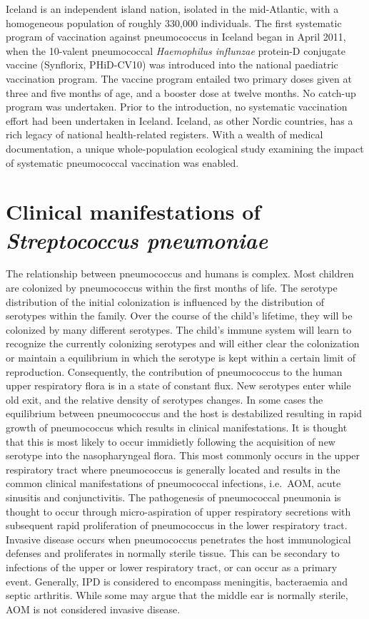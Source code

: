 \documentclass[]{book}
\theoremstyle{definition}
\theoremstyle{definition}
\theoremstyle{definition}
\theoremstyle{remark}
\begin{document}
Iceland is an independent island nation, isolated in the mid-Atlantic,
with a homogeneous population of roughly 330,000 individuals. The first
systematic program of vaccination against pneumococcus in Iceland began
in April 2011, when the 10-valent pneumococcal \emph{Haemophilus
influnzae} protein-D conjugate vaccine (Synflorix, PHiD-CV10) was
introduced into the national paediatric vaccination program. The vaccine
program entailed two primary doses given at three and five months of
age, and a booster dose at twelve months. No catch-up program was
undertaken. Prior to the introduction, no systematic vaccination effort
had been undertaken in Iceland. Iceland, as other Nordic countries, has
a rich legacy of national health-related registers. With a wealth of
medical documentation, a unique whole-population ecological study
examining the impact of systematic pneumococcal vaccination was enabled.

\section{\texorpdfstring{Clinical manifestations of \emph{Streptococcus
pneumoniae}}{Clinical manifestations of Streptococcus pneumoniae}}\label{clinical-manifestations-of-streptococcus-pneumoniae}

The relationship between pneumococcus and humans is complex. Most
children are colonized by pneumococcus within the first months of life.
The serotype distribution of the initial colonization is influenced by
the distribution of serotypes within the family. Over the course of the
child's lifetime, they will be colonized by many different serotypes.
The child's immune system will learn to recognize the currently
colonizing serotypes and will either clear the colonization or maintain
a equilibrium in which the serotype is kept within a certain limit of
reproduction. Consequently, the contribution of pneumococcus to the
human upper respiratory flora is in a state of constant flux. New
serotypes enter while old exit, and the relative density of serotypes
changes. In some cases the equilibrium between pneumococcus and the host
is destabilized resulting in rapid growth of pneumococcus which results
in clinical manifestations. It is thought that this is most likely to
occur immidietly following the acquisition of new serotype into the
nasopharyngeal flora. This most commonly occurs in the upper respiratory
tract where pneumococcus is generally located and results in the common
clinical manifestations of pneumococcal infections, i.e.~AOM, acute
sinusitis and conjunctivitis. The pathogenesis of pneumococcal pneumonia
is thought to occur through micro-aspiration of upper respiratory
secretions with subsequent rapid proliferation of pneumococcus in the
lower respiratory tract. Invasive disease occurs when pneumococcus
penetrates the host immunological defenses and proliferates in normally
sterile tissue. This can be secondary to infections of the upper or
lower respiratory tract, or can occur as a primary event. Generally, IPD
is considered to encompass meningitis, bacteraemia and septic arthritis.
While some may argue that the middle ear is normally sterile, AOM is not
considered invasive disease.
\end{document}
